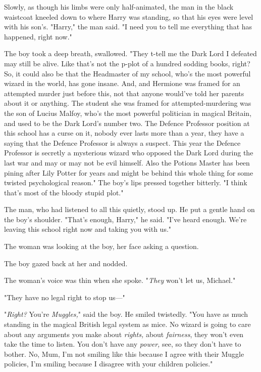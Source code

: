 Slowly, as though his limbs were only half-animated, the man in the black waistcoat
kneeled down to where Harry was standing, so that his eyes were level with his
son's. "Harry," the man said. "I need you to tell me everything that has
happened, right now."

The boy took a deep breath, swallowed. "They t-tell me the Dark Lord I defeated
may still be alive. Like that's not the p-plot of a hundred sodding books,
right? So, it could also be that the Headmaster of my school, who's the most
powerful wizard in the world, has gone insane. And, and Hermione was framed for
an attempted murder just before this, not that anyone would've told her parents
about it or anything. The student she was framed for attempted-murdering was
the son of Lucius Malfoy, who's the most powerful politician in magical
Britain, and used to be the Dark Lord's number two. The Defence Professor
position at this school has a curse on it, nobody ever lasts more than a year,
they have a saying that the Defence Professor is always a suspect. This year
the Defence Professor is secretly a mysterious wizard who opposed the Dark Lord
during the last war and may or may not be evil himself. Also the Potions Master
has been pining after Lily Potter for years and might be behind this whole
thing for some twisted psychological reason." The boy's lips pressed together
bitterly. "I think that's most of the bloody stupid plot."

The man, who had listened to all this quietly, stood up. He put a gentle hand
on the boy's shoulder. "That's enough, Harry," he said. "I've heard enough.
We're leaving this school right now and taking you with us."

The woman was looking at the boy, her face asking a question.

The boy gazed back at her and nodded.

The woman's voice was thin when she spoke. "\emph{They} won't let us, Michael."

"They have no legal right to stop us---"

"\emph{Right?} You're \emph{Muggles,}" said the boy. He smiled twistedly. "You
have as much standing in the magical British legal system as mice. No wizard is
going to care about any arguments you make about \emph{rights,} about
\emph{fairness}, they won't even take the time to listen. You don't have any
\emph{power,} see, so they don't have to bother. No, Mum, I'm not smiling like
this because I agree with their Muggle policies, I'm smiling because I disagree
with your children policies."

